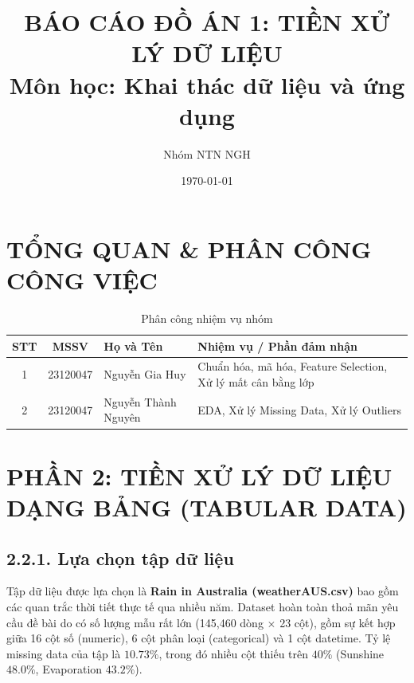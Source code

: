 \documentclass[12pt,a4paper]{article}
\title{\textbf{BÁO CÁO ĐỒ ÁN 1: TIỀN XỬ LÝ DỮ LIỆU\\Môn học: Khai thác dữ liệu và ứng dụng}}
\author{Nhóm NTN NGH}
\date{\today}
\begin{document}
\maketitle
\tableofcontents
\newpage

\section{TỔNG QUAN \& PHÂN CÔNG CÔNG VIỆC}
\begin{table}[H]
    \centering
    \begin{tabular}{|c|c|p{4cm}|p{6.5cm}|}
        \hline
        \textbf{STT} & \textbf{MSSV} & \textbf{Họ và Tên} & \textbf{Nhiệm vụ / Phần đảm nhận} \\ \hline
        1 & 23120047 & Nguyễn Gia Huy & Chuẩn hóa, mã hóa, Feature Selection, Xử lý mất cân bằng lớp \\ \hline
        2 & 23120047 & Nguyễn Thành Nguyên & EDA, Xử lý Missing Data, Xử lý Outliers \\ \hline
    \end{tabular}
    \caption{Phân công nhiệm vụ nhóm}
\end{table}

\section{PHẦN 2: TIỀN XỬ LÝ DỮ LIỆU DẠNG BẢNG (TABULAR DATA)}
\subsection{2.2.1. Lựa chọn tập dữ liệu}
Tập dữ liệu được lựa chọn là \textbf{Rain in Australia (weatherAUS.csv)} bao gồm các quan trắc thời tiết thực tế qua nhiều năm. Dataset hoàn toàn thoả mãn yêu cầu đề bài do có số lượng mẫu rất lớn (145,460 dòng $\times$ 23 cột), gồm sự kết hợp giữa 16 cột số (numeric), 6 cột phân loại (categorical) và 1 cột datetime. Tỷ lệ missing data của tập là $10.73\%$, trong đó nhiều cột thiếu trên $40\%$ (Sunshine $48.0\%$, Evaporation $43.2\%$).
\end{document}
